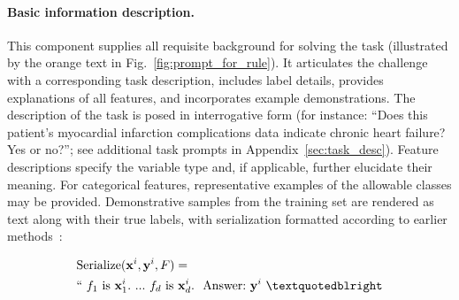 \vspace*{-0.12in}
\paragraph{Basic information description.} This component supplies all requisite background for solving the task (illustrated by the orange text in Fig.~\ref{fig:prompt_for_rule}). It articulates the challenge with a corresponding task description, includes label details, provides explanations of all features, and incorporates example demonstrations. The description of the task is posed in interrogative form (for instance: ``Does this patient’s myocardial infarction complications data indicate chronic heart failure? Yes or no?''; see additional task prompts in Appendix~\ref{sec:task_desc}). Feature descriptions specify the variable type and, if applicable, further elucidate their meaning. For categorical features, representative examples of the allowable classes may be provided. Demonstrative samples from the training set are rendered as text along with their true labels, with serialization formatted according to earlier methods~\cite{dinh2022lift,hegselmann2023tabllm}:

\begin{align}
&\text{Serialize}(\mathbf{x}^i,\mathbf{y}^i, F) = \nonumber \\ 
&``\ f_1\ \text{is}\ \mathbf{x}^i_1.\ ... \ f_d\  \text{is}\  \mathbf{x}^i_d.\ \ \text{Answer:}\  \mathbf{y}^i\ ”
\end{align}

\vspace*{-0.12in}
